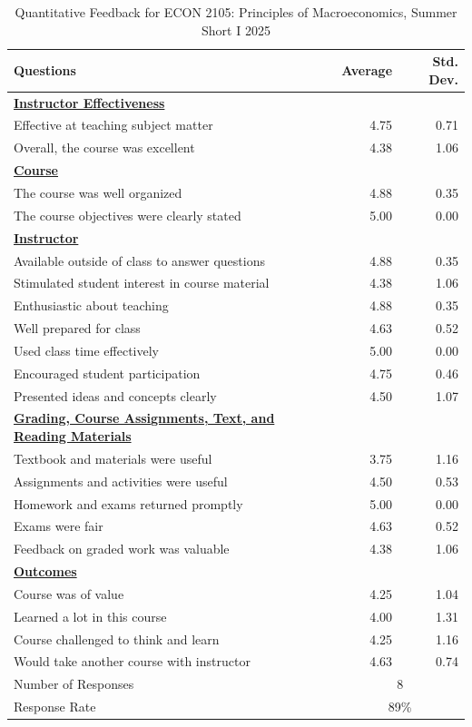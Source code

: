 \documentclass[11pt]{article}
\begin{document}
\begin{table}[H]
\centering
\caption{Quantitative Feedback for ECON 2105: Principles of Macroeconomics, Summer Short I 2025}
\begin{tabular}{@{}p{}rr@{}}
\toprule
\textbf{Questions} & \textbf{Average} & \textbf{Std. Dev.} \\
\midrule
\textbf{\underline{Instructor Effectiveness}} & & \\
Effective at teaching subject matter & 4.75 & 0.71 \\
Overall, the course was excellent & 4.38 & 1.06 \\
\textbf{\underline{Course}} & & \\
The course was well organized & 4.88 & 0.35 \\
The course objectives were clearly stated & 5.00 & 0.00 \\
\addlinespace
\textbf{\underline{Instructor}} & & \\
Available outside of class to answer questions & 4.88 & 0.35 \\
Stimulated student interest in course material & 4.38 & 1.06 \\
Enthusiastic about teaching & 4.88 & 0.35 \\
Well prepared for class & 4.63 & 0.52 \\
Used class time effectively & 5.00 & 0.00 \\
Encouraged student participation & 4.75 & 0.46 \\
Presented ideas and concepts clearly & 4.50 & 1.07 \\
\addlinespace
\textbf{\underline{Grading, Course Assignments, Text, and Reading Materials}} & & \\
Textbook and materials were useful & 3.75 & 1.16 \\
Assignments and activities were useful & 4.50 & 0.53 \\
Homework and exams returned promptly & 5.00 & 0.00 \\
Exams were fair & 4.63 & 0.52 \\
Feedback on graded work was valuable & 4.38 & 1.06 \\
\addlinespace
\textbf{\underline{Outcomes}} & & \\
Course was of value & 4.25 & 1.04 \\
Learned a lot in this course & 4.00 & 1.31 \\
Course challenged to think and learn & 4.25 & 1.16 \\
Would take another course with instructor & 4.63 & 0.74 \\
\midrule
Number of Responses & \multicolumn{2}{c}{8} \\
Response Rate & \multicolumn{2}{c}{89\%} \\
\bottomrule
\end{tabular}
\end{table}
\end{document}

